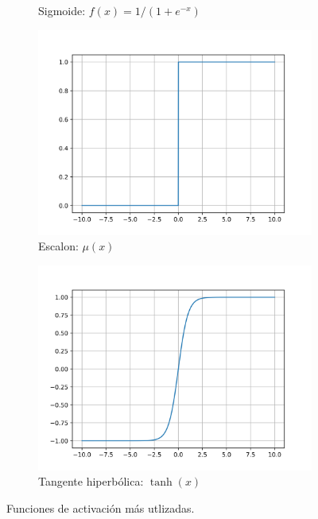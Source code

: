 \begin{figure}[bth]
\begin{subfigure}{.45\textwidth}
        \caption{Sigmoide: $f(x)=1 / (1 + e^{-x})$}
    \end{subfigure}
    \hfill
    \begin{subfigure}{.45\textwidth}
        \centering
        \includegraphics[width=1\textwidth]{imgs/activacion/step.png}
        \caption{Escalon: $\mu(x)$}
    \end{subfigure}
    \begin{subfigure}{.45\textwidth}
        \centering
        \includegraphics[width=1\textwidth]{imgs/activacion/tanh.png}
        \caption{Tangente hiperbólica: $\tanh(x)$}
    \end{subfigure}
    \caption{Funciones de activación más utlizadas.}
    \label{fig:funciones-activacion}
\end{figure}

